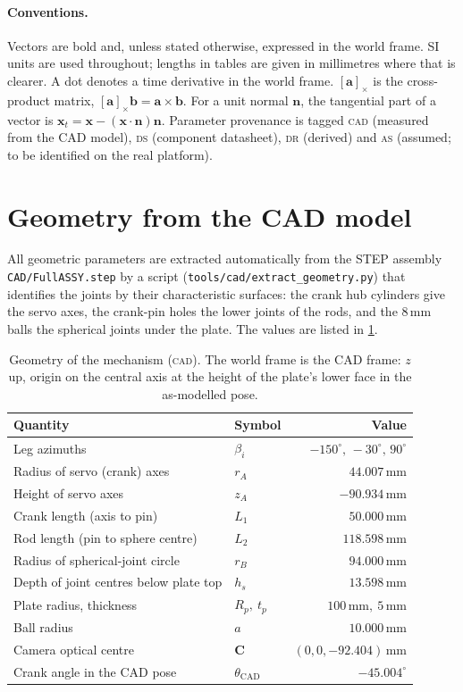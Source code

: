 \documentclass[10pt,a4paper]{article}
\newcommand{\un}[1]{\,\mathrm{#1}}
\newcommand{\vect}[1]{\bm{#1}}
\newcommand{\hatn}{\vect{n}}
\newcommand{\tagCAD}{\textsc{cad}}
\newcommand{\tagDS}{\textsc{ds}}
\newcommand{\tagAS}{\textsc{as}}
\newcommand{\tagDR}{\textsc{dr}}
\begin{document}
\paragraph{Conventions.} Vectors are bold and, unless stated otherwise, expressed in the world
frame. SI units are used throughout; lengths in tables are given in millimetres where that is
clearer. A dot denotes a time derivative in the world frame. $[\vect a]_\times$ is the
cross-product matrix, $[\vect a]_\times\vect b=\vect a\times\vect b$. For a unit normal
$\hatn$, the tangential part of a vector is $\vect x_t=\vect x-(\vect x\cdot\hatn)\hatn$.
Parameter provenance is tagged \tagCAD{} (measured from the CAD model), \tagDS{} (component
datasheet), \tagDR{} (derived) and \tagAS{} (assumed; to be identified on the real platform).

\section{Geometry from the CAD model}\label{sec:geometry}
All geometric parameters are extracted automatically from the STEP assembly
\texttt{CAD/FullASSY.step} by a script (\texttt{tools/cad/extract\_geometry.py}) that
identifies the joints by their characteristic surfaces: the crank hub cylinders give the servo
axes, the crank-pin holes the lower joints of the rods, and the \(8\un{mm}\) balls the
spherical joints under the plate. The values are listed in \cref{tab:geometry}.

\begin{table}[h]
\centering
\caption{Geometry of the mechanism (\tagCAD). The world frame is the CAD frame: $z$ up, origin
on the central axis at the height of the plate's lower face in the as-modelled pose.}
\label{tab:geometry}
\begin{tabular}{llr}
\toprule
Quantity & Symbol & Value \\
\midrule
Leg azimuths & $\beta_i$ & $-150^\circ,\,-30^\circ,\,90^\circ$ \\
Radius of servo (crank) axes & $r_A$ & $44.007\un{mm}$ \\
Height of servo axes & $z_A$ & $-90.934\un{mm}$ \\
Crank length (axis to pin) & $L_1$ & $50.000\un{mm}$ \\
Rod length (pin to sphere centre) & $L_2$ & $118.598\un{mm}$ \\
Radius of spherical-joint circle & $r_B$ & $94.000\un{mm}$ \\
Depth of joint centres below plate top & $h_s$ & $13.598\un{mm}$ \\
Plate radius, thickness & $R_p,\ t_p$ & $100\un{mm},\ 5\un{mm}$ \\
Ball radius & $a$ & $10.000\un{mm}$ \\
Camera optical centre & $\vect C$ & $(0,0,-92.404)\un{mm}$ \\
Crank angle in the CAD pose & $\theta_{\mathrm{CAD}}$ & $-45.004^\circ$ \\
\bottomrule
\end{tabular}
\end{table}
\end{document}
